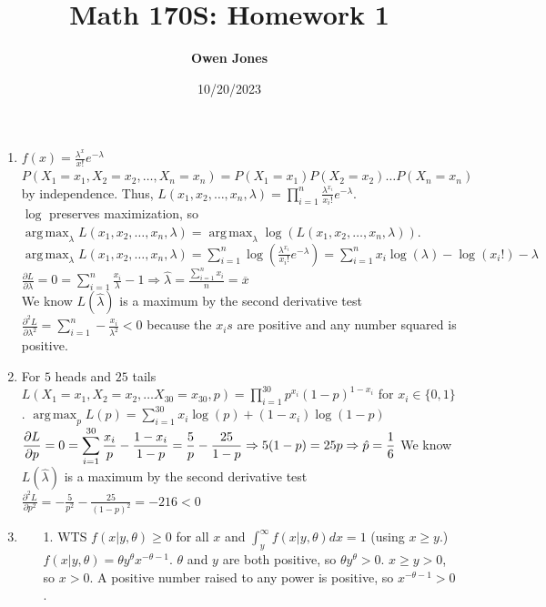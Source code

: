 \documentclass[10pt]{article}
\title{\bf Math 170S: Homework 1}
\date{10/20/2023}
\author{\bf Owen Jones}
\DeclareMathOperator*{\argmax}{arg\,max}
\begin{document}
\maketitle
\begin{enumerate}[label=\textbf{Problem \arabic*.}]
    \item $f(x)=\frac{\lambda^x}{x!}e^{-\lambda}$
        $P(X_1=x_1,X_2=x_2,\ldots,X_n=x_n)=P(X_1=x_1)P(X_2=x_2)\ldots P(X_n=x_n)$ by independence. Thus, $L(x_1,x_2,\ldots,x_n,\lambda)=\displaystyle\prod_{i=1}^{n}\frac{\lambda^{x_i}}{x_i!}e^{-\lambda}$.\\
        $\log$ preserves maximization, so $\displaystyle \argmax_\lambda L(x_1,x_2,\ldots,x_n,\lambda)=\argmax_\lambda \log (L(x_1,x_2,\ldots,x_n,\lambda))$.\\
        $\displaystyle \argmax_\lambda L(x_1,x_2,\ldots,x_n,\lambda)=\sum_{i=1}^{n}\log(\frac{\lambda^{x_i}}{x_i!}e^{-\lambda})=\sum_{i=1}^{n}x_i\log(\lambda)-\log(x_i!)-\lambda$
        $\frac{\partial L}{\partial \lambda}=0=\displaystyle \sum_{i=1}^{n}\frac{x_i}{\lambda}-1\Rightarrow \hat{\lambda}=\frac{\displaystyle\sum_{i=1}^{n}x_i}{n}=\overline{x}$\\
    We know $L(\hat{\lambda})$ is a maximum by the second derivative test $\displaystyle\frac{\partial^2L}{\partial\lambda^2}=\sum_{i=1}^{n}-\frac{x_i}{\lambda^2}<0$ because the $x_is$ are positive and any number squared is positive.
    \item For $5$ heads and $25$ tails $L(X_1=x_1,X_2=x_2,\ldots X_{30}=x_{30},p)=\displaystyle\prod_{i=1}^{30}p^{x_i}{(1-p)}^{1-x_i}$ for $x_i\in\{0,1\}$.
    $\displaystyle\argmax_p L(p)=\sum_{i=1}^{30}x_i\log(p)+(1-x_i)\log(1-p)$
    $\displaystyle\frac{\partial L}{\partial p}=0=\sum_{i=1}^{30}\frac{x_i}{p}-\frac{1-x_i}{1-p}=\frac{5}{p}-\frac{25}{1-p}\Rightarrow 5(1-p)=25p\Rightarrow \hat{p}=\frac{1}{6}\\$
    We know $L(\hat{\lambda})$ is a maximum by the second derivative test $\displaystyle\frac{\partial^2L}{\partial p^2}=-\frac{5}{p^2}-\frac{25}{{(1-p)}^2}=-216<0$
    \item \begin{itemize}
        \item [1.] WTS $f(x|y,\theta)\ge0$ for all $x$ and $\int_{y}^{\infty}f(x|y,\theta)dx=1$ (using $x\ge y$.)\\
        $f(x|y,\theta)=\theta y^\theta x^{-\theta-1}$. 
        $\theta$ and $y$ are both positive, so $\theta y^\theta>0$. $x\ge y>0$, so $x>0$. 
        A positive number raised to any power is positive, so $x^{-\theta-1}>0$. 

\end{itemize}
\end{enumerate}
\end{document}
